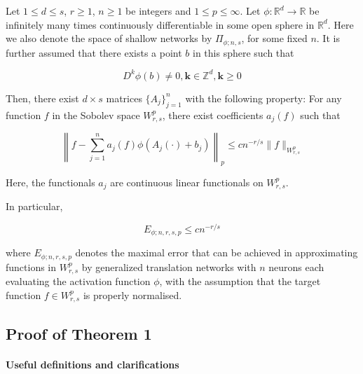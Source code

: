 \documentclass{article}
\begin{document}
Let \(1 \leq d \leq s\), \(r \geq 1\), \(n \geq 1\) be integers and \(1 \leq p \leq \infty\). Let \(\phi: \mathbb{R}^d \rightarrow \mathbb{R}\) be infinitely many times continuously differentiable in some open sphere in \(\mathbb{R}^d\). Here we also denote the space of shallow networks by \(\Pi_{\phi ; n,s}\), for some fixed \(n\). It is further assumed that there exists a point \(b\) in this sphere such that

\begin{equation}
    D^k \phi(b) \neq 0, \mathbf{k} \in \mathbb{Z}^d, \mathbf{k} \geq 0
\end{equation}

Then, there exist \(d \times s\) matrices \(\{A_j\}_{j=1}^n\) with the following property: For any function \(f\) in the Sobolev space \(W^p_{r,s}\), there exist coefficients \(a_j(f)\) such that

\[ \left\| f - \sum_{j=1}^{n} a_j(f) \phi(A_j(\cdot) + b_{j}) \right\|_p \leq c n^{-r/s} \|f\|_{W^{p}_{r,s}} \]

Here, the functionals \(a_j\) are continuous linear functionals on \(W^p_{r,s}\).

In particular, 

\[ E_{\phi;n,r,s,p} \leq c n^{-r/s} \]

where \( E_{\phi;n,r,s,p} \) denotes the maximal error that can be achieved in approximating functions in \(W^p_{r,s}\) by generalized translation networks with \(n\) neurons each evaluating the activation function \(\phi \), with the assumption that the target function \(f \in W^p_{r,s}\) is properly normalised.


\subsection{Proof of Theorem 1}


\paragraph{Useful definitions and clarifications} 
\end{document}
